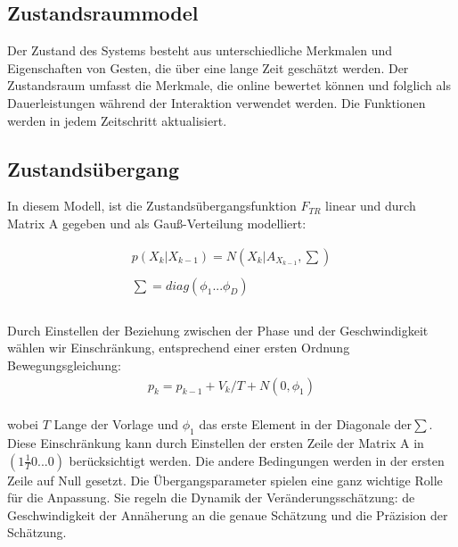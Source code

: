 \documentclass{llncs}
\begin{document}
\subsection{ Zustandsraummodel}
Der Zustand des Systems besteht aus unterschiedliche Merkmalen und Eigenschaften von Gesten, die über eine lange Zeit geschätzt werden. Der Zustandsraum umfasst die Merkmale, die online bewertet können und folglich als Dauerleistungen während der Interaktion verwendet werden. Die Funktionen werden in jedem Zeitschritt aktualisiert.

\subsection{ Zustandsübergang}

In diesem Modell, ist die Zustandsübergangsfunktion $F_{TR}$ linear und durch Matrix A gegeben und als Gauß-Verteilung modelliert: 

\begin{equation}
\left.\begin{array}{l}
 p(X_k|X_{k-1}) =  N(X_k|A_{X_{k-1}},\sum )\\\\ 
		\sum   = diag(\phi_1...\phi_D)             \\
		\\
\end{array}\right.		
\end{equation}

Durch Einstellen der Beziehung zwischen der Phase und der Geschwindigkeit wählen wir Einschränkung, entsprechend einer ersten Ordnung Bewegungsgleichung: 
\begin{equation}
\left.\begin{array}{l}
p_k=p_{k-1} + V_k/T + N(0,\phi_1)	
\end{array}\right.		
\end{equation}					
\\
wobei $T$ Lange der Vorlage und $\phi_1$ das erste Element in der Diagonale der$ \sum$. Diese Einschränkung kann durch Einstellen der ersten Zeile der Matrix A in $ (1  \frac{1}{T}  0 ...0) $ berücksichtigt werden. Die andere Bedingungen werden in der ersten Zeile auf Null gesetzt.
Die Übergangsparameter spielen eine ganz wichtige Rolle für die Anpassung. Sie regeln die Dynamik  der Veränderungsschätzung: de Geschwindigkeit der Annäherung an die genaue Schätzung und die Präzision der Schätzung.
\end{document}
